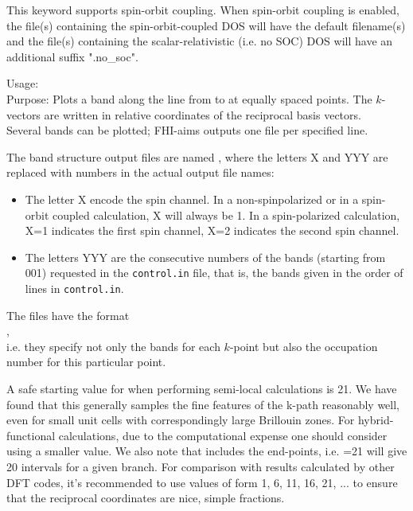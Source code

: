 This keyword supports spin-orbit coupling.  When spin-orbit coupling is
enabled, the file(s) containing the spin-orbit-coupled DOS will have the
default filename(s) and the file(s) containing the scalar-relativistic
(i.e. no SOC) DOS will have an additional suffix ".no\_soc".


{
  \noindent
  Usage:   \\[1.0ex]
  Purpose: Plots a band along the line from
     to
   at  equally
  spaced points. The $k$-vectors are written in relative
  coordinates of the reciprocal basis vectors. \\
}
Several bands can be plotted; FHI-aims outputs one file
per specified  line.

The band structure output files are named
, where the letters X and YYY are replaced with
numbers in the actual output file names:
\begin{itemize}
\item The letter X encode the spin
channel. In a non-spinpolarized or in a spin-orbit coupled
calculation, X will always be 1. In a spin-polarized calculation, X=1
indicates the first spin channel, X=2 indicates the second spin
channel.
\item The letters YYY are the consecutive numbers of the bands
(starting from 001) requested in the \texttt{control.in} file, that
is, the bands given in the order of  
lines in \texttt{control.in}.
\end{itemize}
The files  have the format\\[1.0ex]
%
, \\[1.0ex]
%
i.e. they specify not only the bands for each $k$-point but also
the occupation number for this particular point.

A safe starting value for  when performing semi-local
calculations is 21.  We have found that this generally samples the fine
features of the k-path reasonably well, even for small unit cells with
correspondingly large Brillouin zones.  For hybrid-functional calculations,
due to the computational expense one should consider using a smaller value.
We also note that  includes the end-points, i.e.
=21 will give 20 intervals for a given branch.  For
comparison with results calculated by other DFT codes, it's recommended to
use values of form 1, 6, 11, 16, 21, ... to ensure that the reciprocal
coordinates are nice, simple fractions.

